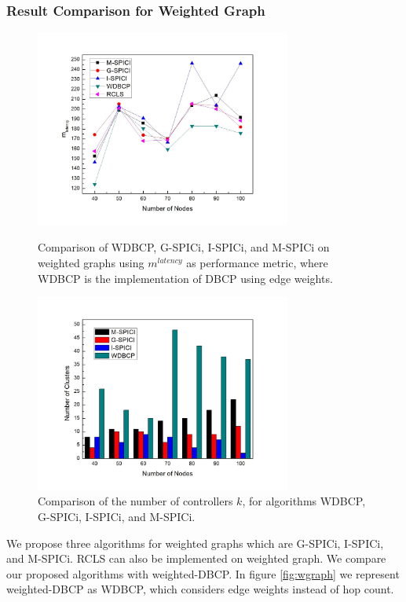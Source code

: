 \documentclass[times]{dacauth}
\begin{document}
\subsubsection{Result Comparison for Weighted Graph}
\begin{figure}
	\centering 
	\includegraphics[width=0.75\textwidth]{Figures/wgraph.jpg}
	\caption{ Comparison of WDBCP, G-SPICi, I-SPICi, and M-SPICi on weighted graphs using $m^{latency}$ as performance metric, where WDBCP is the implementation of DBCP using edge weights.}
	\label{fig:wgraph}
	\centering 
	\includegraphics[width=0.75\textwidth]{Figures/wbar.jpg}
	\caption{ Comparison of the number of controllers $k$, for algorithms WDBCP, G-SPICi, I-SPICi, and M-SPICi.}
	\label{fig:wbar}
\end{figure}
We propose three algorithms for weighted graphs which are G-SPICi, I-SPICi, and M-SPICi. RCLS can also be implemented on weighted graph. We compare our proposed algorithms with weighted-DBCP. In figure \ref{fig:wgraph} we represent weighted-DBCP as WDBCP, which considers edge weights instead of hop count.
\end{document}
